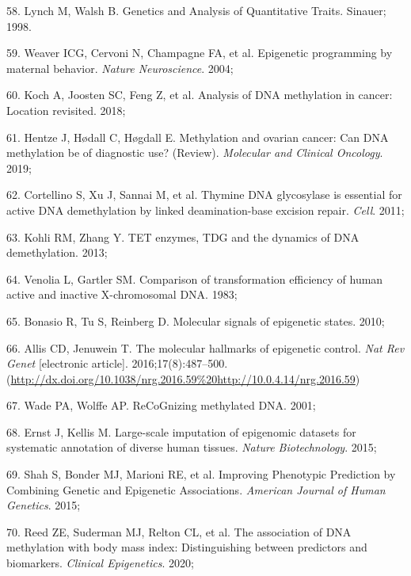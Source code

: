 \documentclass[11pt,oneside]{bristolthesis}
\newenvironment{cslreferences}%
  {}%
  {\par}
\begin{document}
\begin{cslreferences}
\leavevmode\hypertarget{ref-Lynch1998}{}%
58. Lynch M, Walsh B. Genetics and Analysis of Quantitative Traits. Sinauer; 1998.

\leavevmode\hypertarget{ref-Weaver2004}{}%
59. Weaver ICG, Cervoni N, Champagne FA, et al. Epigenetic programming by maternal behavior. \emph{Nature Neuroscience}. 2004;

\leavevmode\hypertarget{ref-Koch2018}{}%
60. Koch A, Joosten SC, Feng Z, et al. Analysis of DNA methylation in cancer: Location revisited. 2018;

\leavevmode\hypertarget{ref-Hentze2019}{}%
61. Hentze J, Hødall C, Høgdall E. Methylation and ovarian cancer: Can DNA methylation be of diagnostic use? (Review). \emph{Molecular and Clinical Oncology}. 2019;

\leavevmode\hypertarget{ref-Cortellino2011}{}%
62. Cortellino S, Xu J, Sannai M, et al. Thymine DNA glycosylase is essential for active DNA demethylation by linked deamination-base excision repair. \emph{Cell}. 2011;

\leavevmode\hypertarget{ref-Kohli2013}{}%
63. Kohli RM, Zhang Y. TET enzymes, TDG and the dynamics of DNA demethylation. 2013;

\leavevmode\hypertarget{ref-Venolia1983}{}%
64. Venolia L, Gartler SM. Comparison of transformation efficiency of human active and inactive X-chromosomal DNA. 1983;

\leavevmode\hypertarget{ref-Bonasio2010}{}%
65. Bonasio R, Tu S, Reinberg D. Molecular signals of epigenetic states. 2010;

\leavevmode\hypertarget{ref-Allis2016}{}%
66. Allis CD, Jenuwein T. The molecular hallmarks of epigenetic control. \emph{Nat Rev Genet} {[}electronic article{]}. 2016;17(8):487--500. (\url{http://dx.doi.org/10.1038/nrg.2016.59\%20http://10.0.4.14/nrg.2016.59})

\leavevmode\hypertarget{ref-Wade2001}{}%
67. Wade PA, Wolffe AP. ReCoGnizing methylated DNA. 2001;

\leavevmode\hypertarget{ref-Ernst2015}{}%
68. Ernst J, Kellis M. Large-scale imputation of epigenomic datasets for systematic annotation of diverse human tissues. \emph{Nature Biotechnology}. 2015;

\leavevmode\hypertarget{ref-Shah2015}{}%
69. Shah S, Bonder MJ, Marioni RE, et al. Improving Phenotypic Prediction by Combining Genetic and Epigenetic Associations. \emph{American Journal of Human Genetics}. 2015;

\leavevmode\hypertarget{ref-Reed2020}{}%
70. Reed ZE, Suderman MJ, Relton CL, et al. The association of DNA methylation with body mass index: Distinguishing between predictors and biomarkers. \emph{Clinical Epigenetics}. 2020;


\end{cslreferences}
\end{document}
